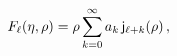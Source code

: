 \[\mathop{F_{\ell}\/}\nolimits\!\left(\eta,\rho\right)=\rho\sum_{k=0}^{\infty}a_%
{k}\mathop{\mathsf{j}_{\ell+k}\/}\nolimits\!\left(\rho\right),\]